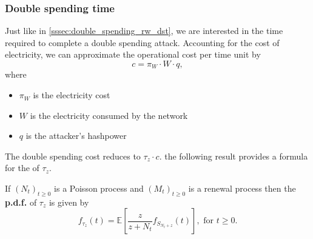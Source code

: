 \subsubsection{Double spending time}\label{sssec:double_spending_counting_process_dst}
Just like in \cref{sssec:double_spending_rw_dst}, we are interested in the time required to complete a double spending attack. Accounting for the cost of electricity, we can approximate the operational cost per time unit by 
$$
c = \pi_W\cdot W\cdot q,
$$
where 
\begin{itemize}
  \item $\pi_W$ is the electricity cost
  \item $W$ is the electricity consumed by the network
  \item  $q$ is the attacker's hashpower
\end{itemize}
The double spending cost reduces to $\tau_z\cdot c$. the following result provides a formula for the \pdf of $\tau_z$.
\begin{theo}
If $(N_t)_{t\geq0}$ is a Poisson process and $(M_t)_{t\geq0}$ is a renewal process then the \textbf{p.d.f.} of $\tau_z$ is given by
\begin{equation}\label{eq:DS_time_pdf}
f_{\tau_z}(t)=\mathbb{E}\left[\frac{z}{z+N_t}f_{S_{N_t+z}}(t)\right],\text{ for }t\geq0.
\end{equation}
\end{theo}
